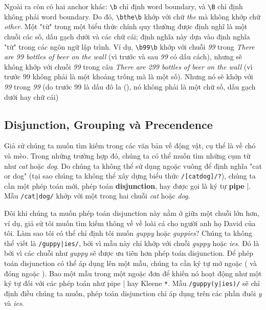 Ngoài ra còn có hai anchor khác: \verb|\b| chỉ định word boundary, và \verb|\B| chỉ định không phải word boundary. Do đó, \verb|\bthe\b| khớp với chữ \textit{the} mà không khớp chữ \textit{other}. Một "từ" trong một biểu thức chính quy thường được định nghĩ là một chuỗi các số, dấu gạch dưới và các chữ cái; định nghĩa này dựa vào định nghĩa "từ" trong các ngôn ngữ lập trình. Ví dụ, \verb|\b99\b| khớp với chuỗi \textit{99} trong \textit{There are 99 bottles of beer on the wall} (vì trước và sau \textit{99} có dấu cách), nhưng sẽ không khớp với chuỗi \textit{99} trong câu \textit{There are 299 bottles of beer on the wall} (vì trước 99 không phải là một khoảng trống mà là một số). Nhưng nó sẽ khớp với \textit{99} trong \textit{99} (do trước 99 là dấu đô la (), nó không phải là một chữ số, dấu gạch dưới hay chữ cái)

\subsection{Disjunction, Grouping và Precendence}

Giả sử chúng ta muốn tìm kiếm trong các văn bản về động vật, cụ thể là về chó và mèo. Trong những trường hợp đó, chúng ta có thể muốn tìm những cụm từ như \textit{cat} hoặc \textit{dog}. Do chúng ta không thể sử dụng ngoặc vuông để định nghĩa "cat or dog" (tại sao chúng ta không thể xây dựng biểu thức \verb|/[catdog]/?|), chúng ta cần một phép toán mới, phép toán \textbf{disjunction}, hay được gọi là ký tự \textbf{pipe} \verb|||. Mẫu \verb=/cat|dog/= khớp với một trong hai chuỗi \textit{cat} hoặc \textit{dog}.

Đôi khi chúng ta muốn phép toán disjunction này nằm ở giữa một chuỗi lớn hơn, ví dụ, giả sử tôi muốn tìm kiếm thông về về loài cá cho người anh họ David của tôi. Làm sao tôi có thể chỉ định tôi muốn \textit{guppy} hoặc \textit{guppies}? Chúng ta không thể viết là \texttt{/guppy|ies/}, bởi vì mẫu này chỉ khớp với chuỗi \textit{guppy} hoặc \textit{ies}. Đó là bởi vì các chuỗi như \textit{guppy} sẽ được ưu tiên hơn phép toán disjunction. Để phép toán disjunction có thể áp dụng lên một mẫu, chúng ta cần ký tự mở ngoặc ( và đóng ngoặc ). Bao một mẫu trong một ngoặc đơn để khiến nó hoạt động như một ký tự đối với các phép toán như pipe \verb||| hay Kleene \verb|*|. Mẫu \texttt{/guppy(y|ies)/} sẽ chỉ định điều chúng ta muốn, phép toán disjunction chỉ áp dụng trên các phần đuôi \textit{y} và \textit{ies}.

